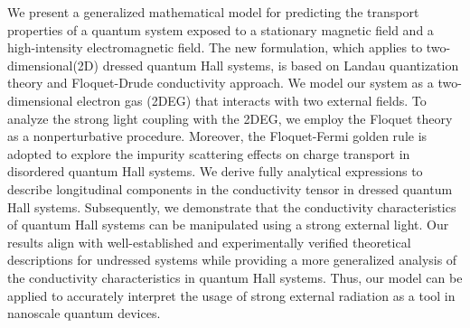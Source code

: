 We present a generalized mathematical model for predicting the transport properties of a quantum system exposed to a stationary magnetic field and a high-intensity electromagnetic field.
The new formulation, which applies to two-dimensional(2D) dressed quantum Hall systems, is based on Landau quantization theory and Floquet-Drude conductivity approach.
We model our system as a two-dimensional electron gas (2DEG) that interacts with two external fields. To analyze the strong light coupling with the 2DEG, we employ the Floquet theory as a nonperturbative procedure.
Moreover, the Floquet-Fermi golden rule is adopted to explore the impurity scattering effects on charge transport in disordered quantum Hall systems.
We derive fully analytical expressions to describe longitudinal components in the conductivity tensor in dressed quantum Hall systems. Subsequently, we demonstrate that the conductivity characteristics of quantum Hall systems can be manipulated using a strong external light.
Our results align with well-established and experimentally
verified theoretical descriptions for undressed systems while providing a more generalized analysis of the conductivity characteristics in quantum Hall systems.
Thus, our model can be applied to accurately interpret the usage of  strong external radiation as a tool in nanoscale quantum devices.
